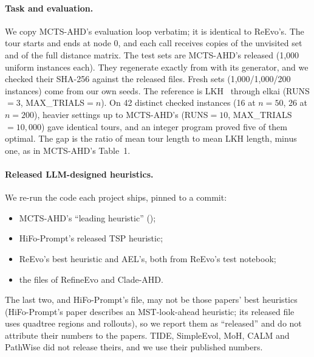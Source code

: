 \paragraph{Task and evaluation.} We copy MCTS-AHD's evaluation loop verbatim; it is identical to
ReEvo's. The tour starts and ends at node 0, and each call receives copies of the unvisited set and
of the full distance matrix. The test sets are MCTS-AHD's released  (1,000
uniform instances each). They regenerate exactly from  with its
generator, and we checked their SHA-256 against the released files. Fresh sets
(1,000/1,000/200 instances) come from our own seeds. The reference is LKH~\cite{lkh} through
elkai (RUNS$=3$, MAX\_TRIALS$=n$). On 42 distinct checked instances (16 at $n=50$, 26 at $n=200$), heavier settings up to MCTS-AHD's (RUNS$=10$, MAX\_TRIALS$=10{,}000$) gave identical tours, and an integer program proved five of them optimal. The gap is the ratio of mean tour length to
mean LKH length, minus one, as in MCTS-AHD's Table~1.

\paragraph{Released LLM-designed heuristics.} We re-run the code each project ships, pinned to a
commit:
\begin{itemize}
\item MCTS-AHD's ``leading heuristic'' ();
\item HiFo-Prompt's released TSP heuristic;
\item ReEvo's best heuristic and AEL's, both from ReEvo's test notebook;
\item the  files of RefineEvo and Clade-AHD.
\end{itemize}
The last two, and HiFo-Prompt's file, may not be those papers' best heuristics (HiFo-Prompt's paper describes an MST-look-ahead heuristic; its released file uses quadtree regions and rollouts), so we report them as ``released'' and do not attribute their numbers to the papers. TIDE,
SimpleEvol, MoH, CALM and PathWise did not release theirs, and we use their published numbers.

